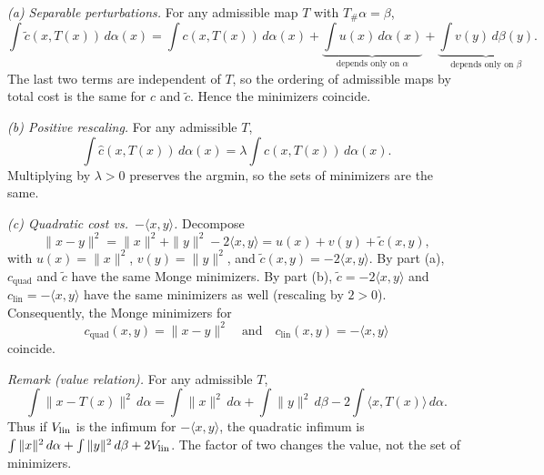 \documentclass[11pt,a4paper]{article}
\theoremstyle{exostyle}
\newcommand{\push}{\#}
\begin{document}
\begin{solution}
\emph{(a) Separable perturbations.}
For any admissible map $T$ with $T_{\push}\alpha=\beta$,
\[
\int \tilde c(x,T(x))\,d\alpha(x)
=\int c(x,T(x))\,d\alpha(x)
+\underbrace{\int u(x)\,d\alpha(x)}_{\text{depends only on }\alpha}
+\underbrace{\int v(y)\,d\beta(y)}_{\text{depends only on }\beta}.
\]
The last two terms are independent of $T$, so the ordering of admissible maps by total cost is the same for $c$ and $\tilde c$. Hence the minimizers coincide.

\emph{(b) Positive rescaling.}
For any admissible $T$,
\[
\int \hat c(x,T(x))\,d\alpha(x)=\lambda\int c(x,T(x))\,d\alpha(x).
\]
Multiplying by $\lambda>0$ preserves the argmin, so the sets of minimizers are the same.

\emph{(c) Quadratic cost vs.\ $-\langle x,y\rangle$.}
Decompose
\[
\|x-y\|^2=\|x\|^2+\|y\|^2-2\langle x,y\rangle
= u(x)+v(y)+\tilde c(x,y),
\]
with $u(x)=\|x\|^2$, $v(y)=\|y\|^2$, and $\tilde c(x,y)=-2\langle x,y\rangle$.
By part (a), $c_{\mathrm{quad}}$ and $\tilde c$ have the same Monge minimizers.
By part (b), $\tilde c=-2\langle x,y\rangle$ and $c_{\mathrm{lin}}=-\langle x,y\rangle$ have the same minimizers as well (rescaling by $2>0$). Consequently, the Monge minimizers for
\[
c_{\mathrm{quad}}(x,y)=\|x-y\|^2
\quad\text{and}\quad
c_{\mathrm{lin}}(x,y)=-\langle x,y\rangle
\]
coincide.

\smallskip
\emph{Remark (value relation).} For any admissible $T$,
\[
\int\|x-T(x)\|^2\,d\alpha
=\int\|x\|^2\,d\alpha+\int\|y\|^2\,d\beta-2\int\langle x,T(x)\rangle\,d\alpha.
\]
Thus if $V_{\rm lin}$ is the infimum for $-\langle x,y\rangle$, the
quadratic infimum is $\int\|x\|^2\,d\alpha+\int\|y\|^2\,d\beta+2V_{\rm lin}$.
The factor of two changes the value, not the set of minimizers.
\end{solution}
\end{document}

